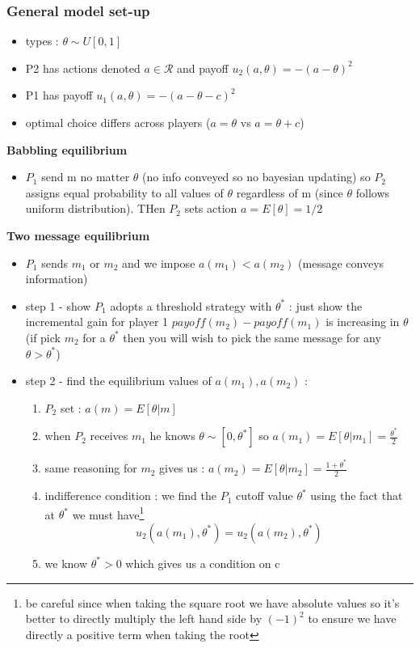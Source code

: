 \documentclass{article}
\begin{document}
\subsubsection{General model set-up}
\begin{itemize}
    \item types : $\theta\sim U[0,1]$
    \item P2 has actions denoted $a\in \mathcal{R}$ and payoff $u_2(a,\theta)=-(a-\theta)^2$
    \item P1 has payoff $u_1(a,\theta)=-(a-\theta-c)^2$
    \item optimal choice differs across players ($a=\theta$ vs $a=\theta+c$)
\end{itemize}
\textbf{Babbling equilibrium}
\begin{itemize}
    \item $P_1$ send m no matter $\theta$ (no info conveyed so no bayesian updating) so $P_2$ assigns equal probability to all values of $\theta$ regardless of m (since $\theta$ follows uniform distribution). THen $P_2$ sets action $a=E[\theta]=1/2$
\end{itemize}
\textbf{Two message equilibrium}
\begin{itemize}
    \item $P_1$ sends $m_1$ or $m_2$ and we impose $a(m_1)<a(m_2)$ (message conveys information)
    \item step 1 - show $P_1$ adopts a threshold strategy with $\theta^*$ : just show the incremental gain for player 1 $payoff(m_2)-payoff(m_1)$ is increasing in $\theta$ (if pick $m_2$ for a $\theta^*$ then you will wish to pick the same message for any $\theta>\theta^*$)
    \item step 2 - find the equilibrium values of $a(m_1),a(m_2)$ : 
    \begin{enumerate}
        \item $P_2$ set : $a(m)=E[\theta|m]$
        \item when $P_2$ receives $m_1$ he knows $\theta\sim[0,\theta^*]$ so $a(m_1)=E[\theta|m_1]=\frac{\theta^*}{2}$
        \item same reasoning for $m_2$ gives us : $a(m_2) = E[\theta|m_2]=\frac{1+\theta^*}{2}$
        \item indifference condition : we find the $P_1$ cutoff value $\theta^*$ using the fact that at $\theta^*$ we must have\footnote{be careful since when taking the square root we have absolute values so it's better to directly multiply the left hand side by $(-1)^2$ to ensure we have  directly a positive term when taking the root}
        \begin{equation}
            u_2(a(m_1),\theta^*)=u_2(a(m_2),\theta^*)
        \end{equation}
        \item we know $\theta^*>0$ which gives us a condition on c
    \end{enumerate}
\end{itemize}
\end{document}
